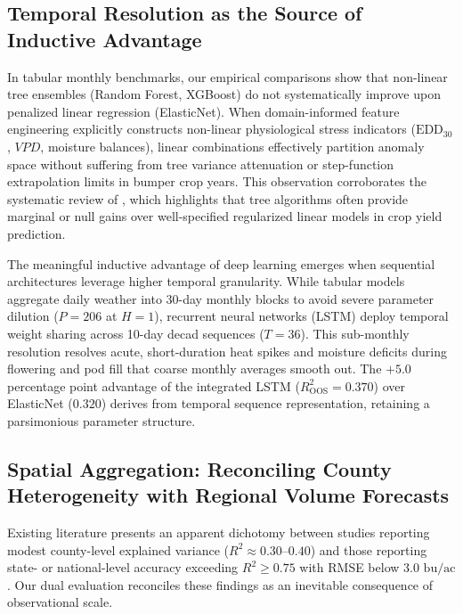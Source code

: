 \subsection{Temporal Resolution as the Source of Inductive Advantage}
In tabular monthly benchmarks, our empirical comparisons show that non-linear tree ensembles (Random Forest, XGBoost) do not systematically improve upon penalized linear regression (ElasticNet). When domain-informed feature engineering explicitly constructs non-linear physiological stress indicators ($\text{EDD}_{30}$, $VPD$, moisture balances), linear combinations effectively partition anomaly space without suffering from tree variance attenuation or step-function extrapolation limits in bumper crop years. This observation corroborates the systematic review of \citet{Sharmaetal2025}, which highlights that tree algorithms often provide marginal or null gains over well-specified regularized linear models in crop yield prediction.

The meaningful inductive advantage of deep learning emerges when sequential architectures leverage higher temporal granularity. While tabular models aggregate daily weather into 30-day monthly blocks to avoid severe parameter dilution ($P = 206$ at $H=1$), recurrent neural networks (LSTM) deploy temporal weight sharing across 10-day decad sequences ($T=36$). This sub-monthly resolution resolves acute, short-duration heat spikes and moisture deficits during flowering and pod fill that coarse monthly averages smooth out. The $+5.0$ percentage point advantage of the integrated LSTM ($R^2_{\text{OOS}} = 0.370$) over ElasticNet ($0.320$) derives from temporal sequence representation, retaining a parsimonious parameter structure.

\subsection{Spatial Aggregation: Reconciling County Heterogeneity with Regional Volume Forecasts}
Existing literature presents an apparent dichotomy between studies reporting modest county-level explained variance ($R^2 \approx 0.30$--$0.40$) and those reporting state- or national-level accuracy exceeding $R^2 \ge 0.75$ with RMSE below $3.0\text{ bu/ac}$ \citep{Khaki2020}. Our dual evaluation reconciles these findings as an inevitable consequence of observational scale.

